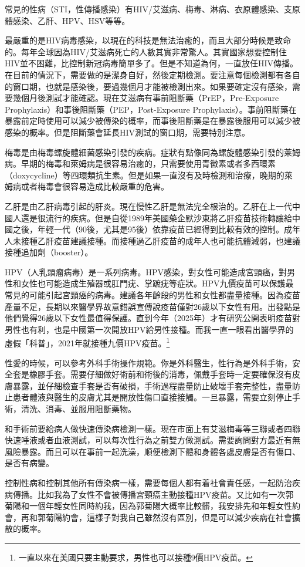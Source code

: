 常見的性病（STI，性傳播感染）有HIV/艾滋病、梅毒、淋病、衣原體感染、支原體感染、乙肝、HPV、HSV等等。

最嚴重的是HIV病毒感染，以現在的科技是無法治癒的，而且大部分時候是致命的。每年全球因為HIV/艾滋病死亡的人數其實非常驚人。其實國家想要控制住HIV並不困難，比控制新冠病毒簡單多了。但是不知道為何，一直放任HIV傳播。在目前的情況下，需要做的是潔身自好，然後定期檢測。要注意每個檢測都有各自的窗口期，也就是感染後，要過幾個月才能被檢測出來。如果要確定沒有感染，需要幾個月後測試才能確認。現在艾滋病有事前阻斷藥（PrEP，Pre-Exposure Prophylaxis）和事後阻斷藥（PEP，Post-Exposure Prophylaxis）。事前阻斷藥在暴露前定時使用可以減少被傳染的概率，而事後阻斷藥是在暴露後服用可以減少被感染的概率。但是阻斷藥會延長HIV測試的窗口期，需要特別注意。

梅毒是由梅毒螺旋體細菌感染引發的疾病。症狀有點像同為螺旋體感染引發的萊姆病。早期的梅毒和萊姆病是很容易治癒的，只需要使用青黴素或者多西環素（doxycycline）等四環類抗生素。但是如果一直沒有及時檢測和治療，晚期的萊姆病或者梅毒會很容易造成比較嚴重的危害。

乙肝是由乙肝病毒引起的肝炎。現在慢性乙肝是無法完全根治的。乙肝在上一代中國人還是很流行的疾病。但是自從1989年美國藥企默沙東將乙肝疫苗技術轉讓給中國之後，年輕一代（90後，尤其是95後）依靠疫苗已經得到比較有效的控制。成年人未接種乙肝疫苗建議接種。而接種過乙肝疫苗的成年人也可能抗體減弱，也建議接種追加劑（booster）。

HPV（人乳頭瘤病毒）是一系列病毒。HPV感染，對女性可能造成宮頸癌，對男性和女性也可能造成生殖器或肛門疣、掌蹠疣等症狀。HPV九價疫苗可以保護最常見的可能引起宮頸癌的病毒。建議各年齡段的男性和女性都盡量接種。因為疫苗產量不足，長期以來醫學界故意錯誤宣傳說疫苗僅對26歲以下女性有用。出發點是他們覺得26歲以下女性最值得保護。直到今年（2025年）才有研究公開表明疫苗對男性也有利，也是中國第一次開放HPV給男性接種。而我一直一眼看出醫學界的虛假「科普」，2021年就接種九價HPV疫苗。\footnote{一直以來在美國只要主動要求，男性也可以接種9價HPV疫苗。}

性愛的時候，可以參考外科手術操作規範。你是外科醫生，性行為是外科手術，安全套是橡膠手套。需要仔細做好術前和術後的消毒，佩戴手套時一定要確保沒有皮膚暴露，並仔細檢查手套是否有破損，手術過程盡量防止破壞手套完整性，盡量防止患者體液與醫生的皮膚尤其是開放性傷口直接接觸。一旦暴露，需要立刻停止手術，清洗、消毒、並服用阻斷藥物。

和手術前要給病人做快速傳染病檢測一樣。現在市面上有艾滋梅毒等三聯或者四聯快速唾液或者血液測試，可以每次性行為之前雙方做測試。需要詢問對方最近有無風險暴露。而且可以在事前一起洗澡，順便檢測下體和身體各處皮膚是否有傷口、是否有病變。

控制性病和控制其他所有傳染病一樣，需要每個人都有着社會責任感，一起防治疾病傳播。比如我為了女性不會被傳播宮頸癌主動接種HPV疫苗。又比如有一次郭菊陽和一個年輕女性同時約我，因為郭菊陽大概率比較髒，我安排先和年輕女性約會，再和郭菊陽約會，這樣子對我自己雖然沒有區別，但是可以減少疾病在社會擴散的概率。
